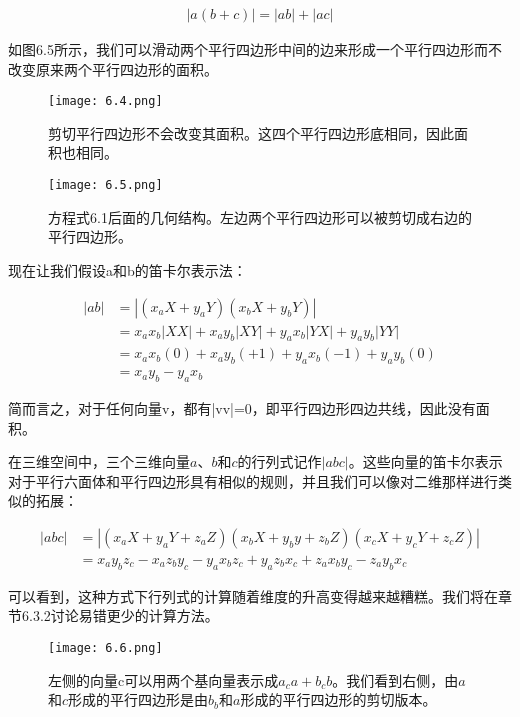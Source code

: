 \documentclass[lang=cn,12pt]{elegantbook}
\begin{document}
\begin{align}
  |a(b+c)| =  |ab| + |ac|
\end{align}

如图6.5所示，我们可以滑动两个平行四边形中间的边来形成一个平行四边形而不改变原来两个平行四边形的面积。

\begin{figure}[htbp]
  \centering
  \texttt{[image: 6.4.png]}
  \caption{剪切平行四边形不会改变其面积。这四个平行四边形底相同，因此面积也相同。}
\end{figure}

\begin{figure}[htbp]
  \centering
  \texttt{[image: 6.5.png]}
  \caption{方程式6.1后面的几何结构。左边两个平行四边形可以被剪切成右边的平行四边形。}
\end{figure}

现在让我们假设a和b的笛卡尔表示法：

\begin{align}
  |ab| & = |(x_aX + y_aY)(x_bX + y_bY)| \nonumber               \\
       & =x_ax_b|XX|+x_ay_b|XY|+y_ax_b|YX|+y_ay_b|YY| \nonumber \\
       & =x_ax_b(0)+x_ay_b(+1)+y_ax_b(-1)+y_ay_b(0) \nonumber   \\
       & = x_a y_b - y_a x_b \nonumber
\end{align}

简而言之，对于任何向量v，都有|vv|=0，即平行四边形四边共线，因此没有面积。

在三维空间中，三个三维向量$a$、$b$和$c$的行列式记作$|abc|$。这些向量的笛卡尔表示对于平行六面体和平行四边形具有相似的规则，并且我们可以像对二维那样进行类似的拓展：

\begin{align}
  |abc| & = |(x_aX+y_aY+z_aZ)(x_bX+y_by+z_bZ)(x_cX+y_cY+z_cZ)| \nonumber         \\
        & =x_ay_bz_c-x_az_by_c-y_ax_bz_c+y_az_bx_c+z_ax_by_c-z_ay_bx_c \nonumber
\end{align}

可以看到，这种方式下行列式的计算随着维度的升高变得越来越糟糕。我们将在章节6.3.2讨论易错更少的计算方法。


\begin{figure}[htbp]
  \centering
  \texttt{[image: 6.6.png]}
  \caption{左侧的向量c可以用两个基向量表示成$a_ca+b_cb$。我们看到右侧，由$a$和$c$形成的平行四边形是由$b_b$和$a$形成的平行四边形的剪切版本。}
\end{figure}
\end{document}
